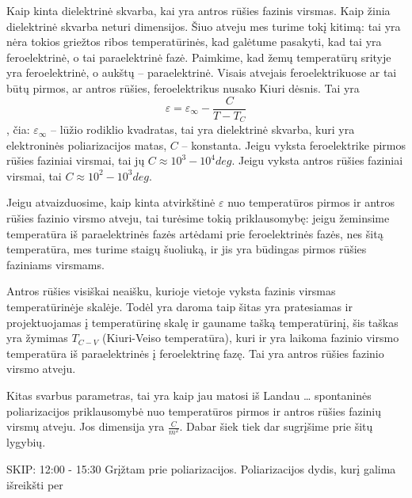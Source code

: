 \begin{note}
  Kaip kinta dielektrinė skvarba, kai yra antros rūšies fazinis virsmas.
  Kaip žinia dielektrinė skvarba neturi dimensijos. Šiuo atveju mes
  turime tokį kitimą: tai yra nėra tokios griežtos ribos
  temperatūrinės, kad galėtume pasakyti, kad tai yra feroelektrinė,
  o tai paraelektrinė fazė. Paimkime, kad žemų temperatūrų
  srityje yra feroelektrinė, o aukštų – paraelektrinė. Visais
  atvejais feroelektrikuose ar tai būtų pirmos, ar antros
  rūšies, feroelektrikus nusako Kiuri dėsnis. Tai yra
  \begin{equation*}
    \varepsilon = \varepsilon_{\infty} - \frac{C}{T - T_{C}}
  \end{equation*},
  čia: $\varepsilon_{\infty}$ – lūžio rodiklio kvadratas, tai yra
  dielektrinė skvarba, kuri yra elektroninės poliarizacijos matas,
  $C$ – konstanta. Jeigu vyksta feroelektrike pirmos rūšies
  faziniai virsmai, tai jų $C \approx 10^{3}-10^{4} deg$.
  Jeigu vyksta antros rūšies faziniai virsmai, tai
  $C \approx 10^{2} - 10^{3} deg$.

  Jeigu atvaizduosime, kaip kinta atvirkštinė $\varepsilon$ nuo
  temperatūros pirmos ir antros rūšies fazinio virsmo atveju,
  tai turėsime tokią priklausomybę:
  jeigu žeminsime temperatūra iš paraelektrinės fazės artėdami
  prie feroelektrinės fazės, nes šitą temperatūra, mes turime
  staigų šuoliuką, ir jis yra būdingas pirmos rūšies faziniams
  virsmams. %

  Antros rūšies visiškai neaišku, kurioje vietoje vyksta fazinis
  virsmas temperatūrinėje skalėje. Todėl yra daroma taip šitas
  yra pratesiamas ir projektuojamas į temperatūrinę skalę
  ir gauname tašką temperatūrinį, šis taškas yra žymimas
  $T_{C-V}$ (Kiuri-Veiso temperatūra), kuri ir yra laikoma
  fazinio virsmo temperatūra iš paraelektrinės į feroelektrinę
  fazę. Tai yra antros rūšies fazinio virsmo atveju.


  Kitas svarbus parametras, tai yra kaip jau matosi iš Landau
  … spontaninės poliarizacijos priklausomybė nuo temperatūros
  pirmos ir antros rūšies fazinių virsmų atveju.
  Jos dimensija yra $\frac{C}{m^{2}}$. Dabar šiek tiek dar
  sugrįšime prie šitų lygybių. 

  SKIP: 12:00 - 15:30
  Grįžtam prie poliarizacijos. Poliarizacijos dydis, kurį
  galima išreikšti per 


\end{note}
